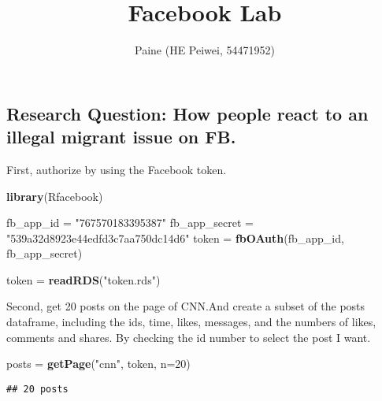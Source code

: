\documentclass[]{article}
\title{Facebook Lab}
\author{Paine (HE Peiwei, 54471952)}
\date{}
\newenvironment{Shaded}{\begin{snugshade}}{\end{snugshade}}
\newcommand{\KeywordTok}[1]{\textcolor[rgb]{0.13,0.29,0.53}{\textbf{{#1}}}}
\newcommand{\DataTypeTok}[1]{\textcolor[rgb]{0.13,0.29,0.53}{{#1}}}
\newcommand{\DecValTok}[1]{\textcolor[rgb]{0.00,0.00,0.81}{{#1}}}
\newcommand{\StringTok}[1]{\textcolor[rgb]{0.31,0.60,0.02}{{#1}}}
\newcommand{\NormalTok}[1]{{#1}}
\begin{document}
\maketitle

\subsection{Research Question: How people react to an illegal migrant
issue on
FB.}\label{research-question-how-people-react-to-an-illegal-migrant-issue-on-fb.}

First, authorize by using the Facebook token.

\begin{Shaded}
\begin{Highlighting}[]
\KeywordTok{library}\NormalTok{(Rfacebook)}
\end{Highlighting}
\end{Shaded}

\begin{Shaded}
\begin{Highlighting}[]
\NormalTok{fb_app_id =}\StringTok{ "767570183395387"}
\NormalTok{fb_app_secret =}\StringTok{ "539a32d8923e44edfd3c7aa750dc14d6"}
\NormalTok{token =}\StringTok{ }\KeywordTok{fbOAuth}\NormalTok{(fb_app_id, fb_app_secret)}
\end{Highlighting}
\end{Shaded}

\begin{Shaded}
\begin{Highlighting}[]
\NormalTok{token =}\StringTok{ }\KeywordTok{readRDS}\NormalTok{(}\StringTok{"token.rds"}\NormalTok{)}
\end{Highlighting}
\end{Shaded}

Second, get 20 posts on the page of CNN.And create a subset of the posts
dataframe, including the ids, time, likes, messages, and the numbers of
likes, comments and shares. By checking the id number to select the post
I want.

\begin{Shaded}
\begin{Highlighting}[]
\NormalTok{posts =}\StringTok{ }\KeywordTok{getPage}\NormalTok{(}\StringTok{"cnn"}\NormalTok{, token, }\DataTypeTok{n=}\DecValTok{20}\NormalTok{)}
\end{Highlighting}
\end{Shaded}

\begin{verbatim}
## 20 posts
\end{verbatim}
\end{document}
